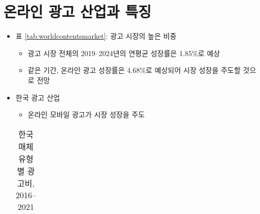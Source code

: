 \section{온라인 광고 산업과 특징}\label{sec:onlinead}
\begin{itemize}
\item 표 \ref{tab:worldcontentsmarket}: 광고 시장의 높은 비중
	\begin{itemize}
	\item 광고 시장 전체의 2019--2024년의 연평균 성장률은 1.85\%로 예상 \cite[p. 11]{hangugkontencheujinheung-won:2020tl}
	\item 같은 기간, 온라인 광고 성장률은 4.68\%로 예상되어 시장 성장을 주도할 것으로 전망 
	\end{itemize}
\item 한국 광고 산업 \citep{hangugbangsong-gwang-gojinheung-gongsa:2020tl}
	\begin{itemize}
	\item 온라인 모바일 광고가 시장 성장을 주도
	\end{itemize}
			\begin{table}[htp]
			\begin{center}
			\begin{threeparttable}
			\caption{한국 매체유형별 광고비, 2016--2021}\label{tab:koreanadmarket}
			\begin{tabularx}{\textwidth}{lrrrrrr}
			\toprule

\end{tabularx}
\end{threeparttable}
\end{center}
\end{table}
\end{itemize}
